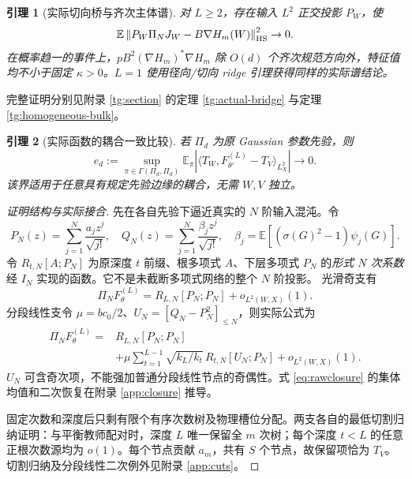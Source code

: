 \documentclass[a4paper]{tufte-handout}
\newtheorem{lemma}{引理}
\newcommand{\E}{\mathbb E}
\newcommand{\norm}[1]{\left\|#1\right\|}
\begin{document}
\begin{fullwidth}
\begin{lemma}[实际切向桥与齐次主体谱]\label{lem:bridge}
对 $L\ge2$，存在输入 $L^2$ 正交投影 $P_W$，使
\begin{equation}\label{eq:bridge}
\E\norm{P_W\Pi_NJ_W-B\nabla H_m(W)}_{\rm HS}^2\to0.
\end{equation}
在概率趋一的事件上，$pB^2(\nabla H_m)^*\nabla H_m$ 除 $O(d)$ 个齐次规范方向外，特征值均不小于固定 $\kappa>0$。$L=1$ 使用径向/切向 ridge 引理获得同样的实际谱结论。
\end{lemma}
完整证明分别见附录 \ref{tg:section} 的定理 \ref{tg:actual-bridge} 与定理 \ref{tg:homogeneous-bulk}。

\begin{lemma}[实际函数的耦合一致比较]\label{lem:cross}
若 $\Pi_d$ 为原 Gaussian 参数先验，则
\begin{equation}\label{eq:cross}
e_d:=\sup_{\pi\in\Gamma(\Pi_d,\Pi_d)}
\E_\pi|\langle T_W,F_{\theta'}^{(L)}-T_V\rangle_{L_X^2}|\longrightarrow0.
\end{equation}
该界适用于任意具有规定先验边缘的耦合，无需 $W,V$ 独立。
\end{lemma}
\begin{proof}[证明结构与实际接合]
先在各自先验下逼近真实的 $N$ 阶输入混沌。令
\[
P_N(z)=\sum_{j=1}^N\frac{a_jz^j}{\sqrt{j!}},\quad
Q_N(z)=\sum_{j=1}^N\frac{\beta_jz^j}{\sqrt{j!}},
\quad\beta_j=\E[(\sigma(G)^2-1)\psi_j(G)].
\]
令 $R_{t,N}[A;P_N]$ 为原深度 $t$ 前缀、根多项式 $A$、下层多项式 $P_N$ 的\emph{形式 $N$ 次系数}经 $I_N$ 实现的函数。它不是未截断多项式网络的整个 $N$ 阶投影。
光滑奇支有
\[
\Pi_NF_\theta^{(L)}=R_{L,N}[P_N;P_N]+o_{L^2(W,X)}(1).
\]
分段线性支令 $\mu=bc_0/2$、$U_N=[Q_N-P_N^2]_{\le N}$，则实际公式为
\begin{equation}\label{eq:rawclosure}\begin{aligned}
\Pi_NF_\theta^{(L)}={}&R_{L,N}[P_N;P_N]\\
&+\mu\sum_{t=1}^{L-1}\sqrt{k_L/k_t}\,R_{t,N}[U_N;P_N]
+o_{L^2(W,X)}(1).
\end{aligned}\end{equation}
$U_N$ 可含奇次项，不能强加普通分段线性节点的奇偶性。式 \eqref{eq:rawclosure} 的集体均值和二次恢复在附录 \ref{app:closure} 推导。

固定次数和深度后只剩有限个有序次数树及物理槽位分配。两支各自的最低切割归纳证明：与平衡教师配对时，深度 $L$ 唯一保留全 $m$ 次树；每个深度 $t<L$ 的任意正根次数源均为 $o(1)$。每个节点贡献 $a_m$，共有 $S$ 个节点，故保留项恰为 $T_V$。切割归纳及分段线性二次例外见附录 \ref{app:cuts}。


\end{proof}
\end{fullwidth}
\end{document}
